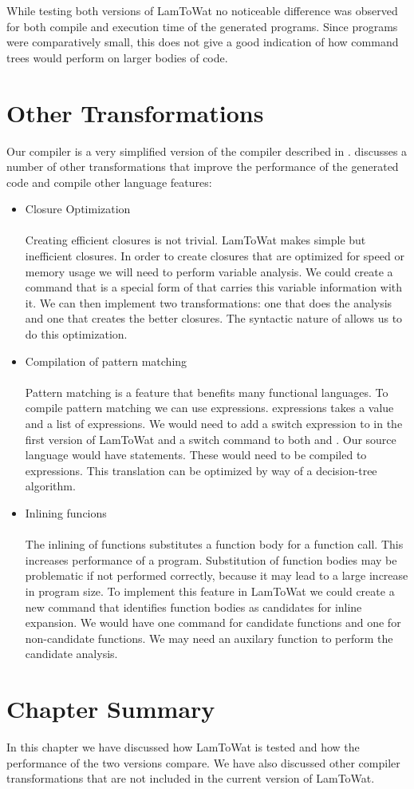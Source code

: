 While testing both versions of LamToWat no noticeable difference was observed for both compile and execution time of the generated programs. Since programs were comparatively small, this does not give a good indication of how command trees would perform on larger bodies of code.

\section{\label{section:othert}Other Transformations}
Our compiler is a very simplified version of the compiler described in  \autocite{DBLP:books/daglib/0022396}. \citeauthor{DBLP:books/daglib/0022396} discusses a number of other transformations that improve the performance of the generated code and compile other language features:

\begin{itemize}
\item Closure Optimization\\\\
Creating efficient closures is not trivial. LamToWat makes simple but inefficient closures. In order to create closures that are optimized for speed or memory usage we will need to perform variable analysis. We could create a command that is a special form of  that carries this variable information with it. We can then implement two transformations: one that does the analysis and one that creates the better closures. The syntactic nature of  allows us to do this optimization.
\item Compilation of pattern matching\\\\
Pattern matching is a feature that benefits many functional languages. To compile pattern matching we can use  expressions.  expressions takes a value and a list of expressions. We would need to add a switch expression to  in the first version of LamToWat and a switch command to both  and . Our source language would have  statements. These would need to be compiled to  expressions. This translation can be optimized by way of a decision-tree algorithm.
\item Inlining funcions\\\\
The inlining of functions substitutes a function body for a function call. This increases performance of a program. Substitution of function bodies may be problematic if not performed correctly, because it may lead to a large increase in program size. To implement this feature in LamToWat we could create a new command that identifies function bodies as candidates for inline expansion. We would have one command for candidate functions and one for non-candidate functions. We may need an auxilary function to perform the candidate analysis.
\end{itemize}

\section{Chapter Summary}
In this chapter we have discussed how LamToWat is tested and how the performance of the two versions compare. We have also discussed other compiler transformations that are not included in the current version of LamToWat.